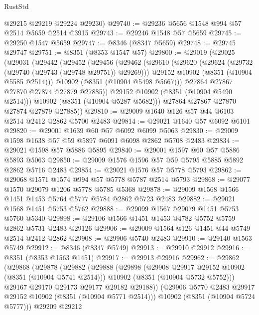 \begin{lexlean}{RustStd}
\begin{coremodule}
      @29215
      @29219
      @29224
      @29230)
@29740 := @29236 @5656 @1548 @994 @57 @2514 @5659 @2514 @3915
@29743 := @29246 @1548 @57 @5659
@29745 := @29250 @1547 @5659
@29747 := @8346 (@8347 @5659)
@29748 := @29745 @29747
@29751 := @8351 (@8353 @1547 @57)
@29800 := @29019
    (@29025
      (@29031
        (@29442
          (@29452
            (@29456
              (@29462
                (@29610
                  (@29620
                    (@29624 (@29732 (@29740 (@29743 (@29748 @29751)) @29269)))
                    @29152
                    @10902
                    (@8351 (@10904 @5585 @2514)))
                  @10902
                  (@8351 (@10904 @5498 @5667)))
                @27864
                @27867
                @27870
                @27874
                @27879
                @27885))
            @29152
            @10902
            (@8351 (@10904 @5490 @2514)))
          @10902
          (@8351 (@10904 @5287 @5682)))
        @27864
        @27867
        @27870
        @27874
        @27879
        @27885))
@29810 := @29009 @1640 @126 @57 @44 @6103 @2514 @2412 @2862 @5700 @2483
@29814 := @29021 @1640 @57 @6092 @6101
@29820 := @29001 @1639 @60 @57 @6092 @6099 @5063
@29830 := @29009 @1598 @1638 @57 @59 @5897 @6091 @6098 @2862 @5708 @2483
@29834 := @29021 @1598 @57 @5886 @5895
@29840 := @29001 @1597 @60 @57 @5886 @5893 @5063
@29850 := @29009 @1576 @1596 @57 @59 @5795 @5885 @5892 @2862 @5716 @2483
@29854 := @29021 @1576 @57 @5778 @5793
@29862 := @29068 @1571 @1574 @994 @57 @5778 @5787 @2514 @5793
@29868 := @29077 @1570 @29079 @1206 @5778 @5785 @5368
@29878 := @29009 @1568 @1566 @1451 @1453 @5764 @5777 @5784 @2862 @5723 @2483
@29882 := @29021 @1568 @1451 @5753 @5762
@29888 := @29099 @1567 @29079 @1451 @5753 @5760 @5340
@29898 := @29106 @1566 @1451 @1453 @4782 @5752 @5759 @2862 @5731 @2483 @29126
@29906 := @29009 @1564 @126 @1451 @44 @5749 @2514 @2412 @2862
@29908 := @29906 @5740 @2483
@29910 := @29140 @1563 @5749
@29912 := @8346 (@8347 @5749)
@29913 := @29910 @29912
@29916 := @8351 (@8353 @1563 @1451)
@29917 := @29913 @29916
@29962 := @29862
    (@29868
      (@29878
        (@29882
          (@29888
            (@29898
              (@29908 @29917 @29152 @10902 (@8351 (@10904 @5741 @2514)))
              @10902
              (@8351 (@10904 @5732 @5752)))
            @29167
            @29170
            @29173
            @29177
            @29182
            @29188))
        (@29906 @5770 @2483 @29917 @29152 @10902 (@8351 (@10904 @5771 @2514)))
        @10902
        (@8351 (@10904 @5724 @5777)))
      @29209
      @29212

\end{coremodule}
\end{lexlean}
